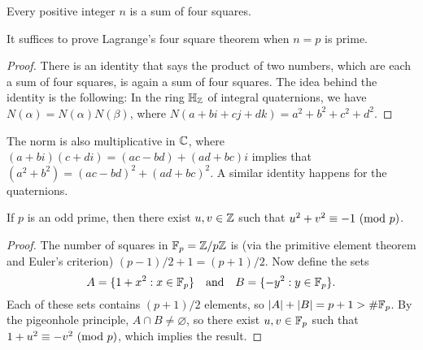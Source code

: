 \begin{theorem}[Lagrange]\label{thm:lagrange-squares}
  Every positive integer $n$ is a sum of four squares.
\end{theorem}

\begin{lemma}
  It suffices to prove Lagrange's four square theorem
  when $n = p$ is prime.
\end{lemma}

\begin{proof}
  There is an identity that says the product of two numbers,
  which are each a sum of four squares, is again a sum of
  four squares. The idea behind the identity is the following:
  In the ring $\mathbb{H}_{\mathbb{Z}}$ of integral quaternions, we have
  $N(\alpha) = N(\alpha) N(\beta)$, where
  $N(a + bi + cj + dk) = a^2 + b^2 + c^2 + d^2$.
\end{proof}

\begin{remark}
  The norm is also multiplicative in $\mathbb{C}$, where
  $(a + bi)(c + di) = (ac - bd) + (ad + bc)i$
  implies that $(a^2 + b^2) = (ac - bd)^2 + (ad + bc)^2$.
  A similar identity happens for the quaternions.
\end{remark}

\begin{lemma}
  If $p$ is an odd prime, then there exist $u,v \in \mathbb{Z}$
  such that $u^2 + v^2 \equiv -1 \ (\mathrm{mod}\ p)$.
\end{lemma}

\begin{proof}
  The number of squares in $\mathbb{F}_p = \mathbb{Z} / p\mathbb{Z}$ is
  (via the primitive element theorem and Euler's criterion)
  $(p - 1) / 2 + 1 = (p + 1) / 2$.
  Now define the sets
  \[
    A = \{1 + x^2 : x \in \mathbb{F}_p\} \quad \text{and} \quad
    B = \{-y^2 : y \in \mathbb{F}_p\}.
  \]
  Each of these sets contains $(p + 1) / 2$ elements, so
  $|A| + |B| = p + 1 > \#\mathbb{F}_p$. By the pigeonhole principle,
  $A \cap B \ne \varnothing$, so there exist $u, v \in \mathbb{F}_p$
  such that $1 + u^2 \equiv -v^2 \ (\mathrm{mod}\ p)$, which
  implies the result.
\end{proof}

